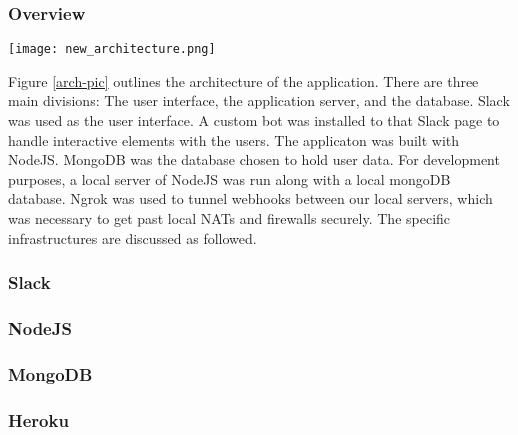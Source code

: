 \subsubsection{Overview}
\begin{figure*}[ht]
\label{arch-pic}
\caption{Architecture Design}
\centering
\texttt{[image: new\_architecture.png]}
\end{figure*}

Figure \ref{arch-pic} outlines the architecture of the application.
There are three main divisions: The user interface, the application server, and the database. 
Slack was used as the user interface. A custom bot was installed to that Slack page to handle 
interactive elements with the users. The applicaton was built with NodeJS. MongoDB was the 
database chosen to hold user data. For development purposes, a local server of NodeJS was run 
along with a local mongoDB database. Ngrok was used to tunnel webhooks between our local servers, 
which was necessary to get past local NATs and firewalls securely. The specific infrastructures are discussed as followed.


\subsubsection{Slack}
\label{sec:slack}


\subsubsection{NodeJS}
\label{sec:nodejs}


\subsubsection{MongoDB}
\label{sec:mongo}


\subsubsection{Heroku}
\label{sec:heroku}







